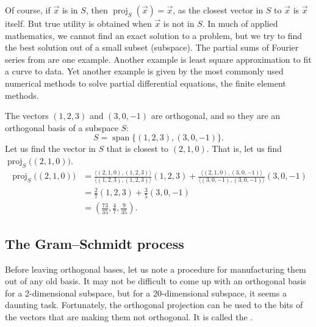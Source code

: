 Of course, if $\vec{x}$ is in $S$, then $\operatorname{proj}_{S}(\vec{x}) =
\vec{x}$, as the closest vector in $S$ to $\vec{x}$ is $\vec{x}$ itself.
But true utility is obtained when $\vec{x}$ is not in $S$.
In much of applied mathematics, we cannot find an exact solution to a problem,
but we try
to find the best solution out of a small subset (subspace).  The partial sums of
Fourier series from  are one example.  Another
example is least square approximation to fit a curve to data.  Yet another
example is given by
the most commonly used numerical methods to solve partial differential
equations, the finite element methods.

\begin{example}
The vectors $(1,2,3)$ and $(3,0,-1)$ are orthogonal, and so they are
an orthogonal basis of a subspace $S$:
\begin{equation*}
S =
\operatorname{span} \bigl\{ (1,2,3), (3,0,-1) \bigr\} .
\end{equation*}
Let us find the vector in $S$ that is closest to $(2,1,0)$.  That is,
let us find $\operatorname{proj}_{S}\bigl((2,1,0)\bigr)$.
\begin{equation*}
\begin{split}
\operatorname{proj}_{S}\bigl((2,1,0)\bigr)
& =
\frac{\langle (2,1,0), (1,2,3) \rangle}{
\langle (1,2,3), (1,2,3) \rangle
}
(1,2,3)
+
\frac{\langle (2,1,0), (3,0,-1) \rangle}{
\langle (3,0,-1), (3,0,-1) \rangle
}
(3,0,-1)
\\
& =
\frac{2}{7}
(1,2,3)
+
\frac{3}{5}
(3,0,-1)
\\
&=
\left( \frac{73}{35} , \frac{4}{7} , \frac{9}{35} \right) .
\end{split}
\end{equation*}
\end{example}

\subsection{The Gram--Schmidt process}

Before leaving orthogonal bases, let us note a procedure for manufacturing
them out of any old basis.  It may not be difficult to come up with an
orthogonal basis for a 2-dimensional subspace, but for a 20-dimensional subspace,
it seems a daunting task.  Fortunately, the orthogonal projection can be
used to  the bits of the vectors that are making them
not orthogonal.  It is called the \emph{}.


